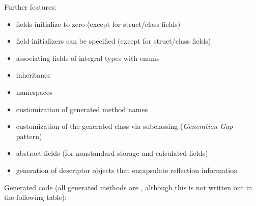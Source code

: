Further features:

\begin{itemize}
  \item  fields initialize to zero (except for struct/class fields)
  \item  field initializers can be specified (except for struct/class fields)
  \item  associating fields of integral types with enums
  \item  inheritance
  \item  namespaces
  \item  customization of generated method names
  \item  customization of the generated class via subclassing (\textit{Generation Gap} pattern)
  \item  abstract fields (for nonstandard storage and calculated fields)
  \item  generation of descriptor objects that encapsulate reflection information
\end{itemize}

Generated code (all generated methods are , although
this is not written out in the following table):

